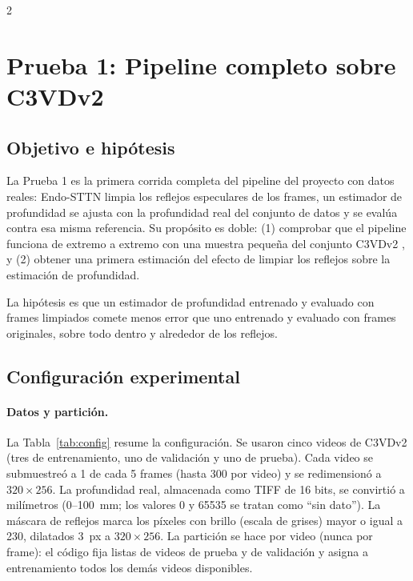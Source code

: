 \documentclass[11pt,letterpaper]{article}
\begin{document}
\raggedcolumns
\begin{multicols}{2}

\section{Prueba 1: Pipeline completo sobre C3VDv2}

\subsection{Objetivo e hipótesis}
La Prueba 1 es la primera corrida completa del pipeline del proyecto con datos reales: Endo-STTN \cite{Daher2023} limpia los reflejos especulares de los frames, un estimador de profundidad se ajusta con la profundidad real del conjunto de datos y se evalúa contra esa misma referencia. Su propósito es doble: (1) comprobar que el pipeline funciona de extremo a extremo con una muestra pequeña del conjunto C3VDv2 \cite{Golhar2025,C3VDData}, y (2) obtener una primera estimación del efecto de limpiar los reflejos sobre la estimación de profundidad.

La hipótesis es que un estimador de profundidad entrenado y evaluado con frames limpiados comete menos error que uno entrenado y evaluado con frames originales, sobre todo dentro y alrededor de los reflejos.

\subsection{Configuración experimental}
\paragraph{Datos y partición.} La Tabla~\ref{tab:config} resume la configuración. Se usaron cinco videos de C3VDv2 (tres de entrenamiento, uno de validación y uno de prueba). Cada video se submuestreó a 1 de cada 5 frames (hasta 300 por video) y se redimensionó a $320\times256$. La profundidad real, almacenada como TIFF de 16 bits, se convirtió a milímetros (0--100~mm; los valores 0 y 65535 se tratan como ``sin dato''). La máscara de reflejos marca los píxeles con brillo (escala de grises) mayor o igual a 230, dilatados 3~px a $320\times256$. La partición se hace por video (nunca por frame): el código fija listas de videos de prueba y de validación y asigna a entrenamiento todos los demás videos disponibles.


\end{multicols}
\end{document}
